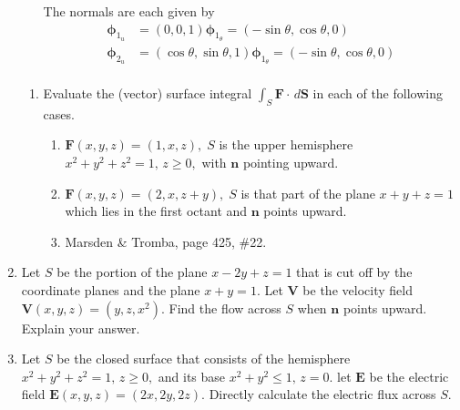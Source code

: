 \documentclass{article}
\begin{document}
\begin{enumerate}
\begin{enumerate}
            The normals are each given by
            \begin{align*}
                \boldsymbol \phi_{1_u} &= (0,0,1) \boldsymbol \phi_{1_\theta} = (-\sin \theta,\cos \theta,0) \\
                \boldsymbol \phi_{2_u} &= (\cos \theta,\sin \theta,1) \boldsymbol \phi_{1_\theta} = (-\sin \theta,\cos \theta,0) \\
            \end{align*}
        \end{enumerate}  
        \begin{enumerate}
            \item Evaluate the (vector) surface integral $\displaystyle \int_S \boldsymbol F \cdot \, d \boldsymbol S$ in each of the following cases.
                \begin{enumerate}
                    \item $\boldsymbol F (x,y,z) = (1,x,z),\; S$ is the upper hemisphere $x^2+y^2+z^2 = 1,\, z \geq 0,$ with $\boldsymbol n $ pointing upward.
                    \item $\boldsymbol F (x,y,z) = (2,x,z+y) ,\; S$ is that part of the plane $x+y+z = 1$ which lies in the first octant and $\boldsymbol n$ points upward.
                    \item Marsden \& Tromba, page 425, \#22.
                \end{enumerate}
        \end{enumerate}
        
    \item Let $S$ be the portion of the plane $x-2y+z=1$ that is cut off by the coordinate planes and the plane $x+y=1$. Let $\boldsymbol V$ be the velocity field $\boldsymbol V (x,y,z) = (y,z,x^2)$. Find the flow across $S$ when $\boldsymbol n$ points upward. Explain your answer.

    \item Let $S$ be the closed surface that consists of the hemisphere $x^2+y^2+z^2 = 1,\, z \geq 0,$ and its base $x^2 + y^2 \leq 1,\, z = 0.$ let $\boldsymbol E$ be the electric field $\boldsymbol E(x,y,z) = (2x,2y,2z).$ Directly calculate the electric flux across $S$.
        
\end{enumerate}
\end{document}
